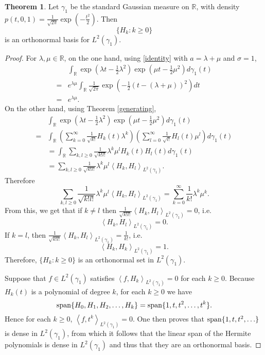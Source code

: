 \documentclass{article}
\newcommand{\inner}[2]{\left\langle #1, #2 \right\rangle}
\newcommand{\Span}{\ensuremath\mathrm{span}}
\theoremstyle{definition}
\newtheorem{theorem}{Theorem}
\theoremstyle{definition}
\begin{document}
\begin{theorem}
Let $\gamma_1$ be the standard Gaussian measure on $\mathbb{R}$, with density
$p(t,0,1)= \frac{1}{\sqrt{2\pi}}  \exp\left( - \frac{t^2}{2} \right)$. Then
\[
\{H_k: k \geq 0\}
\]
is an orthonormal basis for $L^2(\gamma_1)$.
\end{theorem}
\begin{proof}
For $\lambda,\mu \in \mathbb{R}$, on the one hand, using \eqref{identity} with $a=\lambda+\mu$ and $\sigma=1$,
\[
\begin{split}
&\int_{\mathbb{R}} \exp\left(\lambda t-\frac{1}{2}\lambda^2\right) \exp\left(\mu t-\frac{1}{2}\mu^2\right) d\gamma_1(t)\\
=&e^{\lambda \mu} \int_{\mathbb{R}} \frac{1}{\sqrt{2\pi}} \exp\left(-\frac{1}{2}(t-(\lambda+\mu))^2 \right) dt\\
=&e^{\lambda \mu}.
\end{split}
\]
On the other hand,  using Theorem \ref{generating},
\[
\begin{split}
&\int_{\mathbb{R}} \exp\left(\lambda t-\frac{1}{2}\lambda^2\right) \exp\left(\mu t-\frac{1}{2}\mu^2\right) d\gamma_1(t)\\
=&\int_{\mathbb{R}} \left( \sum_{k=0}^\infty  \frac{1}{\sqrt{k!}} H_k(t) \lambda^k\right)
\left(\sum_{l=0}^\infty  \frac{1}{\sqrt{l!}} H_l(t) \mu^l\right) d\gamma_1(t)\\
&=\int_{\mathbb{R}} \sum_{k, l \geq 0} \frac{1}{\sqrt{k! l!}} \lambda^k \mu^l H_k(t) H_l(t) d\gamma_1(t)\\
&=\sum_{k,l \geq 0} \frac{1}{\sqrt{k! l!}}  \lambda^k \mu^l \inner{H_k}{H_l}_{L^2(\gamma_1)}.
\end{split}
\]
Therefore
\[
\sum_{k,l \geq 0} \frac{1}{\sqrt{k! l!}}  \lambda^k \mu^l \inner{H_k}{H_l}_{L^2(\gamma_1)} = \sum_{k=0}^\infty \frac{1}{k!} \lambda^k \mu^k.
\]
From this, we get that if $k \neq l$ then 
$\frac{1}{\sqrt{k! l!}}  \inner{H_k}{H_l}_{L^2(\gamma_1)} = 0$,
i.e.
\[
\inner{H_k}{H_l}_{L^2(\gamma_1)}=0.
\]
 If $k=l$, then
$\frac{1}{\sqrt{k! l!}}  \inner{H_k}{H_l}_{L^2(\gamma_1)} = \frac{1}{k!}$, i.e.
\[
\inner{H_k}{H_k}_{L^2(\gamma_1)}=1.
\]
Therefore, $\{H_k: k \geq 0\}$ is an orthonormal set in $L^2(\gamma_1)$. 

Suppose that $f \in L^2(\gamma_1)$ satisfies $\inner{f}{H_k}_{L^2(\gamma_1)}=0$ for each
$k \geq 0$. 
Because $H_k(t)$ is a polynomial of  degree $k$,  for each $k \geq 0$ we have
\[
\Span\{H_0,H_1,H_2,\ldots,H_k\} = \Span\{1,t,t^2,\ldots,t^k\}.
\]
Hence for each $k \geq 0$, $\inner{f}{t^k}_{L^2(\gamma_1)}=0$. 
One then proves that $\Span\{1,t,t^2,\ldots\}$ is dense in $L^2(\gamma_1)$, from which it follows that
the linear span of the Hermite polynomials is dense in $L^2(\gamma_1)$ and thus that they are an orthonormal basis.
\end{proof}
\end{document}

